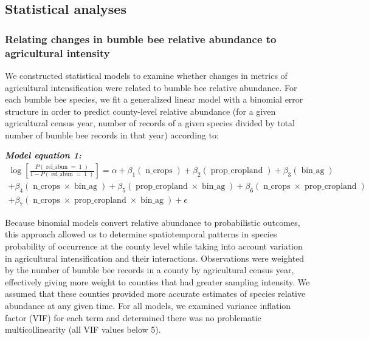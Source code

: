 \documentclass[11pt,]{article}
\begin{document}
\hypertarget{statistical-analyses}{%
\subsection{Statistical analyses}\label{statistical-analyses}}

\hypertarget{relating-changes-in-bumble-bee-relative-abundance-to-agricultural-intensity}{%
\subsubsection{Relating changes in bumble bee relative abundance to
agricultural
intensity}\label{relating-changes-in-bumble-bee-relative-abundance-to-agricultural-intensity}}

We constructed statistical models to examine whether changes in metrics
of agricultural intensification were related to bumble bee relative
abundance. For each bumble bee species, we fit a generalized linear
model with a binomial error structure in order to predict county-level
relative abundance (for a given agricultural census year, number of
records of a given species divided by total number of bumble bee records
in that year) according to:

\emph{\textbf{Model equation 1:}} \[
\begin{aligned} \log\left[ \frac { P( \operatorname{rel\_abun} = \operatorname{1} ) }{ 1 - P( \operatorname{rel\_abun} = \operatorname{1} ) } \right] = \alpha + \beta_{1}(\operatorname{n\_crops}) + \beta_{2}(\operatorname{prop\_cropland}) + \beta_{3}(\operatorname{bin\_ag})\\ + \beta_{4}(\operatorname{n\_crops} \times \operatorname{bin\_ag}) + \beta_{5}(\operatorname{prop\_cropland} \times \operatorname{bin\_ag}) + \beta_{6}(\operatorname{n\_crops} \times \operatorname{prop\_cropland})\\ + \beta_{7}(\operatorname{n\_crops} \times \operatorname{prop\_cropland} \times \operatorname{bin\_ag}) + \epsilon \end{aligned}
\]

Because binomial models convert relative abundance to probabilistic
outcomes, this approach allowed us to determine spatiotemporal patterns
in species probability of occurrence at the county level while taking
into account variation in agricultural intensification and their
interactions. Observations were weighted by the number of bumble bee
records in a county by agricultural census year, effectively giving more
weight to counties that had greater sampling intensity. We assumed that
these counties provided more accurate estimates of species relative
abundance at any given time. For all models, we examined variance
inflation factor (VIF) for each term and determined there was no
problematic multicollinearity (all VIF values below 5).
\end{document}
